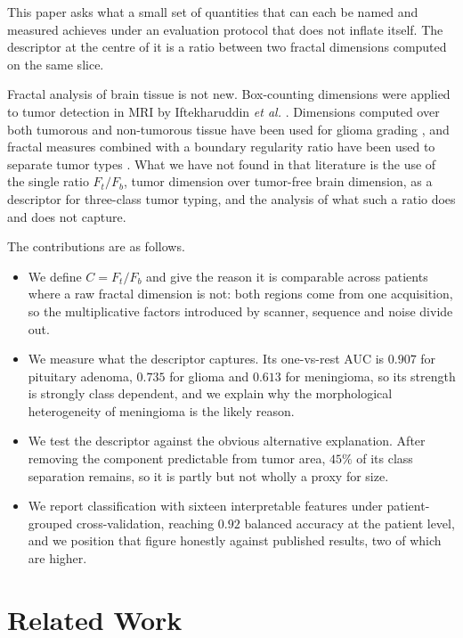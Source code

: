 \documentclass[journal]{IEEEtran}
\begin{document}
This paper asks what a small set of quantities that can each be named and
measured achieves under an evaluation protocol that does not inflate itself. The
descriptor at the centre of it is a ratio between two fractal dimensions computed
on the same slice.

Fractal analysis of brain tissue is not new. Box-counting dimensions were applied
to tumor detection in MRI by Iftekharuddin \emph{et al.} \cite{iftekhar2003}.
Dimensions computed over both tumorous and non-tumorous tissue have been used for
glioma grading \cite{frontiers2023}, and fractal measures combined with a
boundary regularity ratio have been used to separate tumor types
\cite{martin2022}. What we have not found in that literature is the use of the
single ratio $F_t/F_b$, tumor dimension over tumor-free brain dimension, as a
descriptor for three-class tumor typing, and the analysis of what such a ratio
does and does not capture.

The contributions are as follows.

\begin{itemize}
\item We define $C = F_t/F_b$ and give the reason it is comparable across
patients where a raw fractal dimension is not: both regions come from one
acquisition, so the multiplicative factors introduced by scanner, sequence and
noise divide out.

\item We measure what the descriptor captures. Its one-vs-rest AUC is $0.907$
for pituitary adenoma, $0.735$ for glioma and $0.613$ for meningioma, so its
strength is strongly class dependent, and we explain why the morphological
heterogeneity of meningioma is the likely reason.

\item We test the descriptor against the obvious alternative explanation. After
removing the component predictable from tumor area, $45\%$ of its class
separation remains, so it is partly but not wholly a proxy for size.

\item We report classification with sixteen interpretable features under
patient-grouped cross-validation, reaching $0.92$ balanced accuracy at the
patient level, and we position that figure honestly against published results,
two of which are higher.
\end{itemize}

\section{Related Work}
\end{document}
